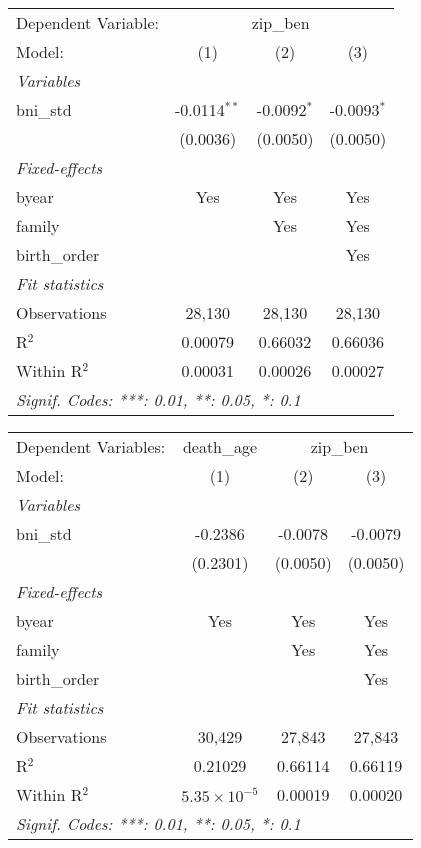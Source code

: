 

\begin{tabular}{lccc}
\tabularnewline\midrule\midrule
Dependent Variable: & \multicolumn{3}{c}{zip\_ben}\\
Model: & (1) & (2) & (3)\\
\midrule \emph{Variables} &   &   &  \\
bni\_std & -0.0114$^{**}$ & -0.0092$^{*}$ & -0.0093$^{*}$\\
  & (0.0036) & (0.0050) & (0.0050)\\
\midrule \emph{Fixed-effects} &   &   &  \\
byear & Yes & Yes & Yes\\
family &  & Yes & Yes\\
birth\_order &  &  & Yes\\
\midrule \emph{Fit statistics} &   &   &  \\
Observations & 28,130 & 28,130 & 28,130\\
R$^2$ & 0.00079 & 0.66032 & 0.66036\\
Within R$^2$ & 0.00031 & 0.00026 & 0.00027\\
\midrule\midrule\multicolumn{4}{l}{\emph{Signif. Codes: ***: 0.01, **: 0.05, *: 0.1}}\\
\end{tabular}



\begin{tabular}{lccc}
\tabularnewline\midrule\midrule
Dependent Variables: & death\_age & \multicolumn{2}{c}{zip\_ben}\\
Model: & (1) & (2) & (3)\\
\midrule \emph{Variables} &   &   &  \\
bni\_std & -0.2386 & -0.0078 & -0.0079\\
  & (0.2301) & (0.0050) & (0.0050)\\
\midrule \emph{Fixed-effects} &   &   &  \\
byear & Yes & Yes & Yes\\
family &  & Yes & Yes\\
birth\_order &  &  & Yes\\
\midrule \emph{Fit statistics} &   &   &  \\
Observations & 30,429 & 27,843 & 27,843\\
R$^2$ & 0.21029 & 0.66114 & 0.66119\\
Within R$^2$ & $5.35\times 10^{-5}$ & 0.00019 & 0.00020\\
\midrule\midrule\multicolumn{4}{l}{\emph{Signif. Codes: ***: 0.01, **: 0.05, *: 0.1}}\\
\end{tabular}



